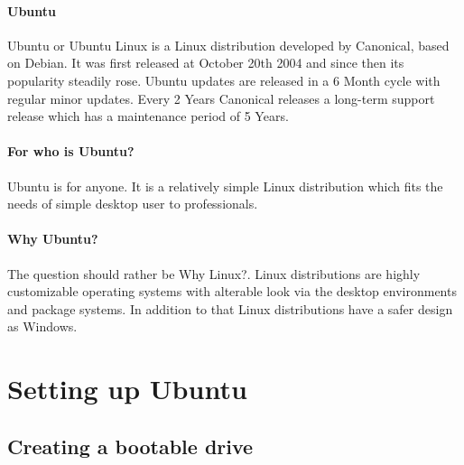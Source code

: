 \documentclass[a4paper,10pt]{article}
\begin{document}
\paragraph{Ubuntu}
Ubuntu or Ubuntu Linux is a Linux distribution developed by Canonical, based on Debian. It was first released at October 20th 2004 and since then its popularity steadily rose. Ubuntu updates are released in a 6 Month cycle with regular minor updates. Every 2 Years Canonical releases a long-term support release which has a maintenance period of 5 Years.

\paragraph{For who is Ubuntu?}

Ubuntu is for anyone. It is a relatively simple Linux distribution which fits the needs of simple desktop user to professionals.

\paragraph{Why Ubuntu?}
The question should rather be Why Linux?. Linux distributions are highly customizable operating systems with alterable look via the desktop environments and package systems. In addition to that Linux distributions have a safer design as Windows.

\section{Setting up Ubuntu}
\subsection{Creating a bootable drive}
\end{document}
